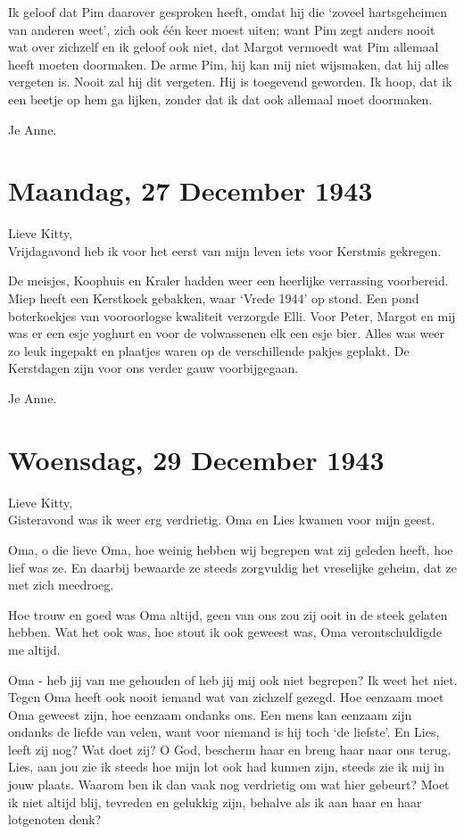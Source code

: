 \documentclass{book}
\begin{document}
Ik geloof dat Pim daarover gesproken heeft, omdat hij die `zoveel
hartsgeheimen van anderen weet', zich ook één keer moest uiten; want Pim
zegt anders nooit wat over zichzelf en ik geloof ook niet, dat Margot
vermoedt wat Pim allemaal heeft moeten doormaken. De arme Pim, hij kan
mij niet wijsmaken, dat hij alles vergeten is. Nooit zal hij dit
vergeten. Hij is toegevend geworden. Ik hoop, dat ik een beetje op hem
ga lijken, zonder dat ik dat ook allemaal moet doormaken.

Je Anne.

\chapter{Maandag, 27 December 1943}

Lieve Kitty,\\Vrijdagavond heb ik voor het eerst van mijn leven iets
voor Kerstmis gekregen.

De meisjes, Koophuis en Kraler hadden weer een heerlijke verrassing
voorbereid. Miep heeft een Kerstkoek gebakken, waar `Vrede 1944' op
stond. Een pond boterkoekjes van vooroorlogse kwaliteit verzorgde Elli.
Voor Peter, Margot en mij was er een esje yoghurt en voor de volwassenen
elk een esje bier. Alles was weer zo leuk ingepakt en plaatjes waren op
de verschillende pakjes geplakt. De Kerstdagen zijn voor ons verder gauw
voorbijgegaan.

Je Anne.

\chapter{Woensdag, 29 December 1943}

Lieve Kitty,\\Gisteravond was ik weer erg verdrietig. Oma en Lies kwamen
voor mijn geest.

Oma, o die lieve Oma, hoe weinig hebben wij begrepen wat zij geleden
heeft, hoe lief was ze. En daarbij bewaarde ze steeds zorgvuldig het
vreselijke geheim, dat ze met zich meedroeg.

Hoe trouw en goed was Oma altijd, geen van ons zou zij ooit in de steek
gelaten hebben. Wat het ook was, hoe stout ik ook geweest was, Oma
verontschuldigde me altijd.

Oma - heb jij van me gehouden of heb jij mij ook niet begrepen? Ik weet
het niet. Tegen Oma heeft ook nooit iemand wat van zichzelf gezegd. Hoe
eenzaam moet Oma geweest zijn, hoe eenzaam ondanks ons. Een mens kan
eenzaam zijn ondanks de liefde van velen, want voor niemand is hij toch
`de liefste'. En Lies, leeft zij nog? Wat doet zij? O God, bescherm haar
en breng haar naar ons terug. Lies, aan jou zie ik steeds hoe mijn lot
ook had kunnen zijn, steeds zie ik mij in jouw plaats. Waarom ben ik dan
vaak nog verdrietig om wat hier gebeurt? Moet ik niet altijd blij,
tevreden en gelukkig zijn, behalve als ik aan haar en haar lotgenoten
denk?
\end{document}
